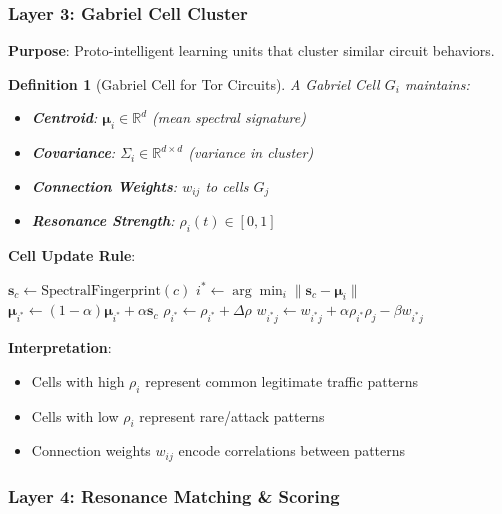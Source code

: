 \documentclass[11pt,a4paper]{article}
\newtheorem{definition}{Definition}[section]
\begin{document}
\subsubsection{Layer 3: Gabriel Cell Cluster}

\textbf{Purpose}: Proto-intelligent learning units that cluster similar circuit behaviors.

\begin{definition}[Gabriel Cell for Tor Circuits]
A Gabriel Cell $G_i$ maintains:
\begin{itemize}
\item \textbf{Centroid}: $\boldsymbol{\mu}_i \in \mathbb{R}^d$ (mean spectral signature)
\item \textbf{Covariance}: $\Sigma_i \in \mathbb{R}^{d \times d}$ (variance in cluster)
\item \textbf{Connection Weights}: $w_{ij}$ to cells $G_j$
\item \textbf{Resonance Strength}: $\rho_i(t) \in [0, 1]$
\end{itemize}
\end{definition}

\textbf{Cell Update Rule}:
\begin{algorithm}
\caption{Gabriel Cell Learning}
\begin{algorithmic}
    \STATE $\mathbf{s}_c \leftarrow \text{SpectralFingerprint}(c)$
    \STATE $i^* \leftarrow \arg\min_i \|\mathbf{s}_c - \boldsymbol{\mu}_i\|$
    \STATE $\boldsymbol{\mu}_{i^*} \leftarrow (1-\alpha) \boldsymbol{\mu}_{i^*} + \alpha \mathbf{s}_c$
    \STATE $\rho_{i^*} \leftarrow \rho_{i^*} + \Delta\rho$
        \STATE $w_{i^* j} \leftarrow w_{i^* j} + \alpha \rho_{i^*} \rho_j - \beta w_{i^* j}$
    \ENDFOR
\ENDFOR
\end{algorithmic}
\end{algorithm}

\textbf{Interpretation}:
\begin{itemize}
\item Cells with high $\rho_i$ represent common legitimate traffic patterns
\item Cells with low $\rho_i$ represent rare/attack patterns
\item Connection weights $w_{ij}$ encode correlations between patterns
\end{itemize}

\subsubsection{Layer 4: Resonance Matching \& Scoring}
\end{document}

